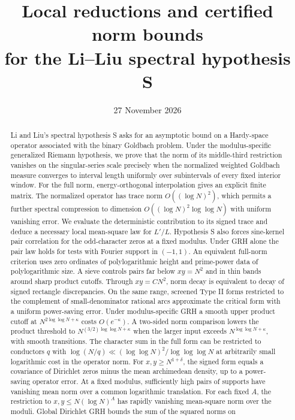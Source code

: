 \documentclass[11pt,a4paper]{article}
\title{\bfseries Local reductions and certified norm bounds\\
for the Li--Liu spectral hypothesis S}
\author{}
\date{27 November 2026}
\numberwithin{equation}{section}
\begin{document}
\maketitle

\begin{abstract}
Li and Liu's spectral hypothesis S asks for an asymptotic bound on a
Hardy-space operator associated with the binary Goldbach problem.
Under the modulus-specific generalized Riemann hypothesis, we prove
that the norm of its middle-third restriction vanishes on the
singular-series scale precisely when the normalized weighted
Goldbach measure converges to interval length uniformly over
subintervals of every fixed interior window.
For the full norm, energy-orthogonal interpolation gives an explicit
finite matrix. The normalized operator has trace norm
$O((\log N)^2)$, which permits a further spectral compression to
dimension $O((\log N)^2\log\log N)$ with uniform vanishing error.
We evaluate the deterministic contribution to its signed trace
and deduce a necessary local mean-square law for $L'/L$.
Hypothesis S also forces sine-kernel pair correlation for the
odd-character zeros at a fixed modulus. Under GRH alone the
pair law holds for tests with Fourier support in $(-1,1)$.
An equivalent full-norm criterion uses zero ordinates of
polylogarithmic height and prime-power data of polylogarithmic size.
A sieve controls pairs far below $xy=N^2$ and in thin bands
around sharp product cutoffs. Through $xy=CN^2$, norm decay
is equivalent to decay of signed rectangle discrepancies.
On the same range, screened Type II forms restricted to the
complement of small-denominator rational arcs approximate
the critical form with a uniform power-saving error.
Under modulus-specific GRH a smooth upper product cutoff at
$N^{2\log\log N+\kappa}$ costs $O(e^{-\kappa})$.
A two-sided norm comparison lowers the product threshold to
$N^{(3/2)\log\log N+\kappa}$ when the larger input exceeds
$N^{\log\log N+\kappa}$, with smooth transitions.
The character sum in the full form can be restricted to
conductors $q$ with $\log(N/q)\ll
(\log\log N)^2/\log\log\log N$ at arbitrarily small
logarithmic cost in the operator norm.
For $x,y\ge N^{1+\delta}$, the signed form equals a covariance
of Dirichlet zeros minus the mean archimedean density, up to a
power-saving operator error.
At a fixed modulus, sufficiently high pairs of supports have
vanishing mean norm over a common logarithmic translation.
For each fixed $A$, the restriction to $x,y\le N(\log N)^A$
has rapidly vanishing mean-square norm over the moduli. Global
Dirichlet GRH bounds the sum of the squared norms on

\end{abstract}
\end{document}
